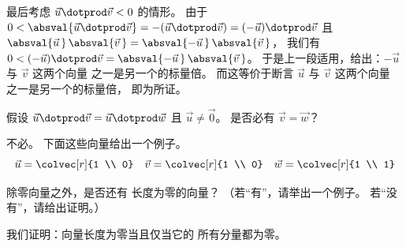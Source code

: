 \begin{exercises}
\begin{answer}
\begin{exparts}
           最后考虑 $\vec{u}\dotprod\vec{v}< 0$ 的情形。
           由于
           $0<\absval{\vec{u}\dotprod\vec{v}}=-(\vec{u}\dotprod\vec{v})
            =(-\vec{u})\dotprod\vec{v}$ 且 
           $\absval{\vec{u}\,}\,\absval{\vec{v}\,}
              =\absval{-\vec{u}\,}\,\absval{\vec{v}\,}$，
           我们有 
           $0<(-\vec{u})\dotprod\vec{v}=\absval{-\vec{u}\,}\,\absval{\vec{v}\,}$。
           于是上一段适用，给出：$-\vec{u}$ 与 $\vec{v}$ 这两个向量
           之一是另一个的标量倍。
           而这等价于断言 $\vec{u}$ 与 $\vec{v}$ 这两个向量
           之一是另一个的标量倍， 
           即为所证。  
      \end{exparts}  
    \end{answer}
  \item 
    假设 \( \vec{u}\dotprod\vec{v}=\vec{u}\dotprod\vec{w} \)
    且 \( \vec{u}\neq\vec{0} \)。
    是否必有 \( \vec{v}=\vec{w} \)？
    \begin{answer}
      不必。
      下面这些向量给出一个例子。
      \begin{equation*}
        \vec{u}=\colvec[r]{1 \\ 0}
        \quad
        \vec{v}=\colvec[r]{1 \\ 0}
        \quad
        \vec{w}=\colvec[r]{1 \\ 1}
      \end{equation*}  
    \end{answer}
  \recommended \item
    除零向量之外，是否还有
    长度为零的向量？
    （若“有”，请举出一个例子。
    若“没有”，请给出证明。）
    \begin{answer}
      我们证明：向量长度为零当且仅当它的
      所有分量都为零。


\end{answer}
\end{exercises}
